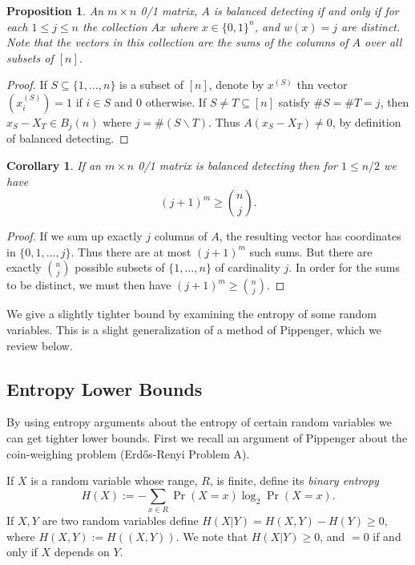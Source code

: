 \documentclass{article}
\newtheorem{proposition}{Proposition}
\newtheorem{corollary}{Corollary}
\begin{document}
\begin{proposition}
  An $m\times n$ 0/1 matrix, $A$ is balanced detecting if and only if
  for each $1 \le j \le n$ the
  collection $A x$ where $x\in \{0,1\}^n$, and $w(x) = j$ are
  distinct.  Note that the vectors in this collection are the sums of
  the columns of $A$ over all subsets of $[n]$.
\end{proposition}
\begin{proof}
  If $S \subseteq \{1, \dots, n\}$ is a subset of $[n]$, denote by
  $x^{(S)}$  thn vector $(x^{(S)}_i) = 1$ if $i \in S$ and 0
  otherwise.  If $S \ne T \subseteq [n]$ satisfy $\#S = \#T = j$, then
  $x_S - X_T \in B_j(n)$ where $j = \# (S \backslash T)$.  Thus
  $A(x_S - X_T) \ne 0$, by definition of balanced detecting.
\end{proof}
\begin{corollary}
  If an $m \times n$ 0/1 matrix is balanced detecting then for $1 \le
  n/2$ we have
  \begin{displaymath}
    (j+1)^m \ge \binom{n}{j}.
  \end{displaymath}
\end{corollary}
\begin{proof}
  If we sum up exactly $j$ columns of $A$, the resulting vector has
  coordinates in $\{0,1, \dots, j\}$.  Thus there are at most
  $(j+1)^m$ such sums.  But there are exactly $\binom{n}{j}$ possible
  subsets of $\{1, \dots, n\}$ of cardinality $j$.  In order for the
  sums to be distinct, we must then have $(j+1)^m \ge \binom{n}{j}$.
\end{proof}
We give a slightly tighter bound by examining the entropy of
some random variables.  This is a slight generalization of a method of
Pippenger, which we review below.

\subsection{Entropy Lower Bounds}
\label{sec:entropy}

By using entropy arguments about the entropy of certain random
variables we can get tighter lower bounds.  First we
recall an argument of Pippenger \cite{pippenger1977information} about
the coin-weighing problem (Erd\H{o}s-Renyi Problem A).

If $X$ is a random variable whose range, $R$, is finite, define its
\emph{binary entropy}
\begin{displaymath}
  H(X) := - \sum_{x \in R} \Pr(X = x) \log_2 \Pr(X = x).
\end{displaymath}
If $X,Y$ are two random variables define $H(X | Y) = H(X, Y) - H(Y)
\ge 0$, where $H(X,Y) := H((X,Y))$.  We note that $H(X | Y) \ge 0$,
and $=0$ if and only if $X$ depends on $Y$.
\end{document}
